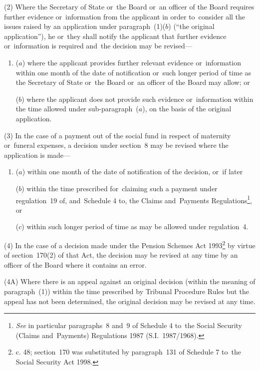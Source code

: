 \documentclass[12pt,a4paper]{article}
\begin{document}
(2) Where the Secretary of State 
or~the Board or~an officer of the Board  %
requires further evidence or~information from the applicant in order to~consider all the issues raised by an application under paragraph~(1)($b$) (“the original application”), he 
or~they  %
shall notify the applicant that further evidence or~information is required and~the decision may be revised—
\begin{enumerate}\item[]
($a$) where the applicant provides further relevant evidence or~information within one month of the date of notification or~such longer period of time as the Secretary of State 
or~the Board or~an officer of the Board  %
may allow; or

($b$) where the applicant does not provide such evidence or~information within the time allowed under sub-paragraph~($a$), on the basis of the original application.
\end{enumerate}

(3) In the case of a payment out of the social fund in respect of maternity or~funeral expenses, a decision under section~8 may be revised where the application is made—
\begin{enumerate}\item[]
($a$) within one month of the date of notification of the decision, or~if later

($b$) within the time prescribed for~claiming such a payment under regulation~19 of, and~Schedule 4 to, the Claims and~Payments Regulations\footnote{\frenchspacing \emph{See} in particular paragraphs~8 and~9 of Schedule 4 to~the Social Security (Claims and~Payments) Regulations 1987 (S.I.~1987/1968).}, or

($c$) within such longer period of time as may be allowed under regulation~4.
\end{enumerate}

(4) In the case of a decision made under the Pension Schemes Act 1993\footnote{ c. 48; section~170 was substituted by paragraph~131 of Schedule 7 to~the Social Security Act 1998.} by virtue of section~170(2) of that Act, the decision may be revised at any time by 
an officer of the Board  %
where it contains an error.

(4A) Where there is an appeal against an original decision (within the meaning of paragraph~(1)) within the time prescribed 
by Tribunal Procedure Rules  %
but the appeal has not been determined, the original decision may be revised at any time.
\end{document}

